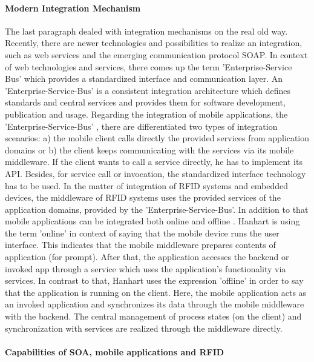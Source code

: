 \paragraph{Modern Integration Mechanism}

The last paragraph dealed with integration mechanisms on the real old way. Recently, there are newer technologies and possibilities to realize an integration, such as web services and the emerging communication protocol \ac{SOAP}. In context of web technologies and services, there comes up the term 'Enterprise-Service Bus' \cite[p.141 ff.]{mobile} which provides a standardized interface and communication layer. An 'Enterprise-Service-Bus' is a consistent integration architecture which defines standards and central services and provides them for software development, publication and usage.  Regarding the integration of mobile applications, the 'Enterprise-Service-Bus' \cite[p.143]{mobile}, there are differentiated two types of integration scenarios: a) the mobile client calls directly the provided services from application domains or b) the client keeps communicating with the services via its mobile middleware. If the client wants to call a service directly, he has to implement its \ac{API}. Besides, for service call or invocation, the standardized interface technology has to be used.
In the matter of integration of RFID systems and embedded devices, the middleware of RFID systems uses the provided services of the application domains, provided by the 'Enterprise-Service-Bus'. In addition to that mobile applications can be integrated both online and offline \cite[p.146 ff.]{mobile}. Hanhart is using the term 'online' in context of saying that the mobile device runs the user interface. This indicates that the mobile middleware prepares contents of application (for prompt). After that, the application accesses the backend or invoked app through a service which uses the application's functionality via services. In contrast to that, Hanhart uses the expression 'offline' in order to say that the application is running on the client. Here, the mobile application acts as an invoked application and synchronizes its data through the mobile middleware with the backend. The central management of process states (on the client) and synchronization with services are realized through the middleware directly.

\paragraph{Capabilities of SOA, mobile applications and RFID}

